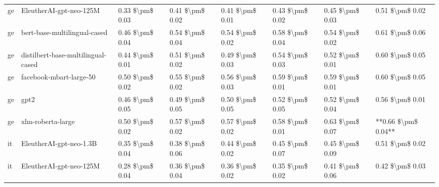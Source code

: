 \begin{tabular}{llllllll}
      ge &            EleutherAI-gpt-neo-125M & 0.33 \$\textbackslash pm\$ 0.03 &           0.41 \$\textbackslash pm\$ 0.02 &       0.41 \$\textbackslash pm\$ 0.01 &        0.43 \$\textbackslash pm\$ 0.02 &                         0.45 \$\textbackslash pm\$ 0.03 &     0.51 \$\textbackslash pm\$ 0.02 \\
      ge &       bert-base-multilingual-cased & 0.46 \$\textbackslash pm\$ 0.04 &           0.54 \$\textbackslash pm\$ 0.04 &       0.54 \$\textbackslash pm\$ 0.02 &        0.58 \$\textbackslash pm\$ 0.04 &                         0.54 \$\textbackslash pm\$ 0.02 &     0.61 \$\textbackslash pm\$ 0.06 \\
      ge & distilbert-base-multilingual-cased & 0.44 \$\textbackslash pm\$ 0.01 &           0.51 \$\textbackslash pm\$ 0.02 &       0.49 \$\textbackslash pm\$ 0.03 &        0.54 \$\textbackslash pm\$ 0.03 &                         0.52 \$\textbackslash pm\$ 0.01 &     0.60 \$\textbackslash pm\$ 0.05 \\
      ge &            facebook-mbart-large-50 & 0.50 \$\textbackslash pm\$ 0.02 &           0.55 \$\textbackslash pm\$ 0.02 &       0.56 \$\textbackslash pm\$ 0.03 &        0.59 \$\textbackslash pm\$ 0.01 &                         0.59 \$\textbackslash pm\$ 0.01 &     0.60 \$\textbackslash pm\$ 0.05 \\
      ge &                               gpt2 & 0.46 \$\textbackslash pm\$ 0.05 &           0.49 \$\textbackslash pm\$ 0.05 &       0.50 \$\textbackslash pm\$ 0.05 &        0.52 \$\textbackslash pm\$ 0.05 &                         0.52 \$\textbackslash pm\$ 0.04 &     0.56 \$\textbackslash pm\$ 0.01 \\
      ge &                  xlm-roberta-large & 0.50 \$\textbackslash pm\$ 0.02 &           0.57 \$\textbackslash pm\$ 0.02 &       0.57 \$\textbackslash pm\$ 0.02 &        0.58 \$\textbackslash pm\$ 0.01 &                         0.63 \$\textbackslash pm\$ 0.07 & **0.66 \$\textbackslash pm\$ 0.04** \\
      it &            EleutherAI-gpt-neo-1.3B & 0.35 \$\textbackslash pm\$ 0.04 &           0.38 \$\textbackslash pm\$ 0.06 &       0.44 \$\textbackslash pm\$ 0.02 &        0.45 \$\textbackslash pm\$ 0.07 &                         0.45 \$\textbackslash pm\$ 0.09 &     0.51 \$\textbackslash pm\$ 0.02 \\
      it &            EleutherAI-gpt-neo-125M & 0.28 \$\textbackslash pm\$ 0.04 &           0.36 \$\textbackslash pm\$ 0.04 &       0.36 \$\textbackslash pm\$ 0.02 &        0.35 \$\textbackslash pm\$ 0.02 &                         0.41 \$\textbackslash pm\$ 0.06 &     0.42 \$\textbackslash pm\$ 0.03 \\

\end{tabular}
